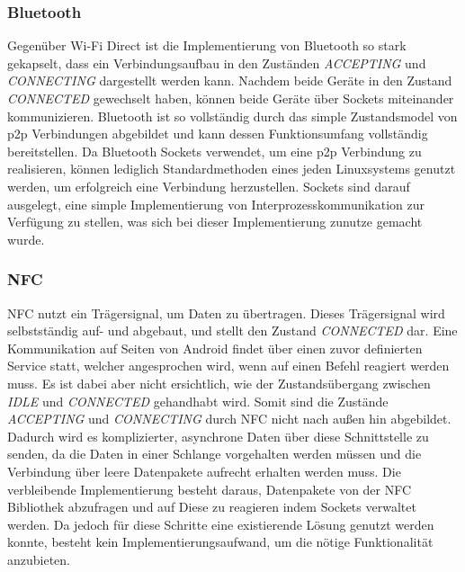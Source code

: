		\subsubsection{Bluetooth} Gegenüber Wi-Fi Direct ist die Implementierung von Bluetooth so stark gekapselt, dass ein Verbindungsaufbau in den Zuständen {\it ACCEPTING} und {\it CONNECTING} dargestellt werden kann. Nachdem beide Geräte in den Zustand {\it CONNECTED} gewechselt haben, können beide Geräte über Sockets miteinander kommunizieren. Bluetooth ist so vollständig durch das simple Zustandsmodel von p2p Verbindungen abgebildet und kann dessen Funktionsumfang vollständig bereitstellen. Da Bluetooth Sockets verwendet, um eine p2p Verbindung zu realisieren, können lediglich Standardmethoden eines jeden Linuxsystems genutzt werden, um erfolgreich eine Verbindung herzustellen. Sockets sind darauf ausgelegt, eine simple Implementierung von Interprozesskommunikation zur Verfügung zu stellen, was sich bei dieser Implementierung zunutze gemacht wurde.
		
	  \subsubsection{NFC} NFC nutzt ein Trägersignal, um Daten zu übertragen. Dieses Trägersignal wird selbstständig auf- und abgebaut, und stellt den Zustand {\it CONNECTED} dar. Eine Kommunikation auf Seiten von Android findet über einen zuvor definierten \linebreak Service statt, welcher angesprochen wird, wenn auf einen Befehl reagiert werden muss. Es ist dabei aber nicht ersichtlich, wie der Zustandsübergang zwischen {\it IDLE} und {\it CONNECTED} gehandhabt wird. Somit sind die Zustände {\it ACCEPTING} und {\it CONNECTING} durch NFC nicht nach außen hin abgebildet. Dadurch wird es komplizierter, asynchrone Daten über diese Schnittstelle zu senden, da die Daten in einer Schlange vorgehalten werden müssen und die Verbindung über leere Datenpakete aufrecht erhalten werden muss. Die verbleibende Implementierung besteht daraus, Datenpakete von der NFC Bibliothek abzufragen und auf Diese zu reagieren indem Sockets verwaltet werden. Da jedoch für diese Schritte eine existierende Lösung genutzt werden konnte, besteht kein Implementierungsaufwand, um die nötige Funktionalität anzubieten.
	  
